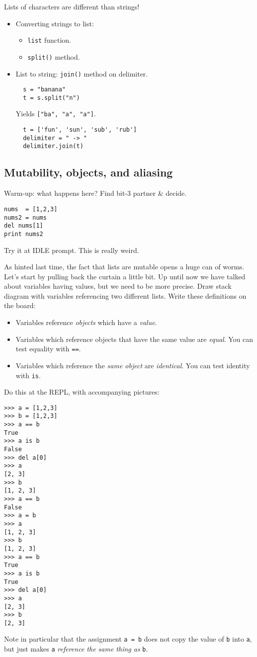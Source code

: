 \documentclass{article}
\begin{document}
Lists of characters are different than strings!

\begin{itemize}
\item Converting strings to list:
  \begin{itemize}
  \item \verb|list| function.
  \item \verb|split()| method.
  \end{itemize}
\item List to string: \verb|join()| method on delimiter.
\begin{verbatim}
  s = "banana"
  t = s.split("n")
\end{verbatim}
Yields \verb|["ba", "a", "a"]|.
\begin{verbatim}
  t = ['fun', 'sun', 'sub', 'rub']
  delimiter = " -> "
  delimiter.join(t)
\end{verbatim}
\end{itemize}

\subsection*{Mutability, objects, and aliasing}

Warm-up: what happens here?  Find bit-3 partner \& decide.
\begin{verbatim}
nums  = [1,2,3]
nums2 = nums
del nums[1]
print nums2
\end{verbatim}

Try it at IDLE prompt.  This is really weird.

As hinted last time, the fact that lists are mutable opens a huge can
of worms.  Let's start by pulling back the curtain a little bit.  Up
until now we have talked about variables having values, but we need to
be more precise.  Draw stack diagram with variables referencing two
different lists.  Write these definitions on the board:

\begin{itemize}
\item Variables reference \emph{objects} which have a \emph{value}.
\item Variables which reference objects that have the same value are
  \emph{equal}.  You can test equality with \verb|==|.
\item Variables which reference the \emph{same object} are
  \emph{identical}. You can test identity with \verb|is|.
\end{itemize}

Do this at the REPL, with accompanying pictures:
\begin{verbatim}
>>> a = [1,2,3]
>>> b = [1,2,3]
>>> a == b
True
>>> a is b
False
>>> del a[0]
>>> a
[2, 3]
>>> b
[1, 2, 3]
>>> a == b
False
>>> a = b
>>> a
[1, 2, 3]
>>> b
[1, 2, 3]
>>> a == b
True
>>> a is b
True
>>> del a[0]
>>> a
[2, 3]
>>> b
[2, 3]
\end{verbatim}
Note in particular that the assignment \verb|a = b| does not copy the
value of \verb|b| into \verb|a|, but just makes \verb|a|
\emph{reference the same thing as} \verb|b|.
\end{document}
